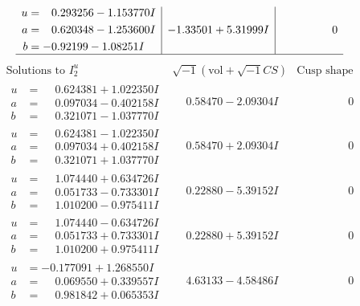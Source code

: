 \documentclass[1p]{elsarticle_modified}
\theoremstyle{definition}
\newcommand{\I}{\sqrt{-1}}
\begin{document}
$$\begin{array}{c|c|c}
\begin{aligned}
u &= \phantom{-}0.293256 - 1.153770 I \\
a &= \phantom{-}0.620348 - 1.253600 I \\
b &= -0.92199 - 1.08251 I\end{aligned}
 & -1.33501 + 5.31999 I & \phantom{-0.000000 } 0\\
 \hline 
 \end{array}$$\newpage$$\begin{array}{c|c|c}  
\text{Solutions to }I^u_{2}& \I (\text{vol} + \sqrt{-1}CS) & \text{Cusp shape}\\
 \hline 
\begin{aligned}
u &= \phantom{-}0.624381 + 1.022350 I \\
a &= \phantom{-}0.097034 - 0.402158 I \\
b &= \phantom{-}0.321071 - 1.037770 I\end{aligned}
 & \phantom{-}0.58470 - 2.09304 I & \phantom{-0.000000 } 0 \\ \hline\begin{aligned}
u &= \phantom{-}0.624381 - 1.022350 I \\
a &= \phantom{-}0.097034 + 0.402158 I \\
b &= \phantom{-}0.321071 + 1.037770 I\end{aligned}
 & \phantom{-}0.58470 + 2.09304 I & \phantom{-0.000000 } 0 \\ \hline\begin{aligned}
u &= \phantom{-}1.074440 + 0.634726 I \\
a &= \phantom{-}0.051733 - 0.733301 I \\
b &= \phantom{-}1.010200 - 0.975411 I\end{aligned}
 & \phantom{-}0.22880 - 5.39152 I & \phantom{-0.000000 } 0 \\ \hline\begin{aligned}
u &= \phantom{-}1.074440 - 0.634726 I \\
a &= \phantom{-}0.051733 + 0.733301 I \\
b &= \phantom{-}1.010200 + 0.975411 I\end{aligned}
 & \phantom{-}0.22880 + 5.39152 I & \phantom{-0.000000 } 0 \\ \hline\begin{aligned}
u &= -0.177091 + 1.268550 I \\
a &= \phantom{-}0.069550 + 0.339557 I \\
b &= \phantom{-}0.981842 + 0.065353 I\end{aligned}
 & \phantom{-}4.63133 - 4.58486 I & \phantom{-0.000000 } 0 \\ \hline\begin{aligned}

\end{aligned}
\end{array}$$
\end{document}
